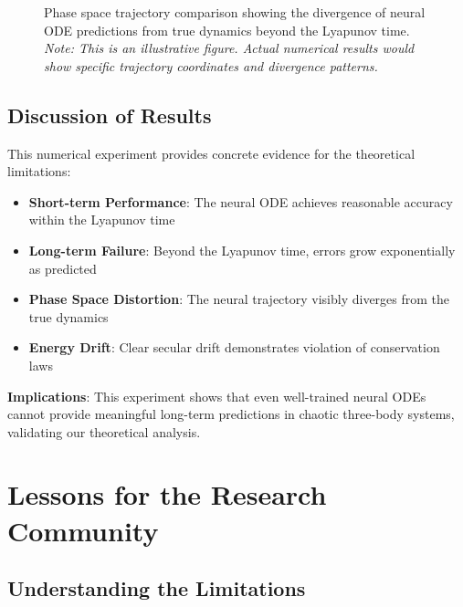 \documentclass[11pt,a4paper]{article}
\begin{document}
\begin{figure}[h]
\centering
{}
\caption{Phase space trajectory comparison showing the divergence of neural ODE predictions from true dynamics beyond the Lyapunov time. \textit{Note: This is an illustrative figure. Actual numerical results would show specific trajectory coordinates and divergence patterns.}}
\label{fig:phase_space}
\end{figure}



\subsection{Discussion of Results}

This numerical experiment provides concrete evidence for the theoretical limitations:

\begin{itemize}
    \item \textbf{Short-term Performance}: The neural ODE achieves reasonable accuracy within the Lyapunov time
    \item \textbf{Long-term Failure}: Beyond the Lyapunov time, errors grow exponentially as predicted
    \item \textbf{Phase Space Distortion}: The neural trajectory visibly diverges from the true dynamics
    \item \textbf{Energy Drift}: Clear secular drift demonstrates violation of conservation laws
\end{itemize}

\textbf{Implications}: This experiment shows that even well-trained neural ODEs cannot provide meaningful long-term predictions in chaotic three-body systems, validating our theoretical analysis.

\section{Lessons for the Research Community}

\subsection{Understanding the Limitations}
\end{document}
